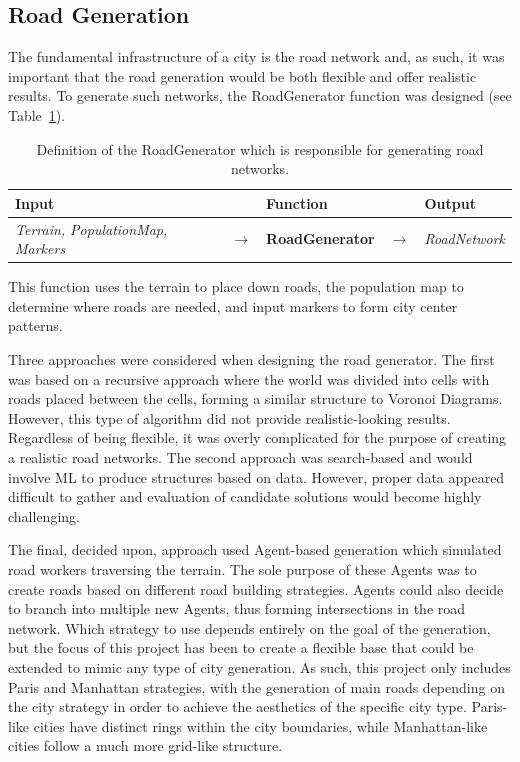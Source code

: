 \subsection{Road Generation}
The fundamental infrastructure of a city is the road network and, as such, it was important that the road generation would be both flexible and offer realistic results.
To generate such networks, the RoadGenerator function was designed (see Table~\ref{table:def_roadgen}).

\begin{table}[H]
  \centering
  \begin{tabular}{lllll}
    \textbf{Input} & & \textbf{Function} & & \textbf{Output} \\
    \midrule
    \textit{Terrain, PopulationMap, Markers} & $\rightarrow$ & \textbf{RoadGenerator}       & $\rightarrow$ & \textit{RoadNetwork}    \\
    \bottomrule
  \end{tabular}

  \caption{Definition of the RoadGenerator which is responsible for generating road networks.}
  \label{table:def_roadgen}
\end{table}
\vspace{-0.4cm}

This function uses the terrain to place down roads, the population map to determine where roads are needed, and input markers to form city center patterns.

Three approaches were considered when designing the road generator.
The first was based on a recursive approach where the world was divided into cells with roads placed between the cells, forming a similar structure to Voronoi Diagrams.
However, this type of algorithm did not provide realistic-looking results.
Regardless of being flexible, it was overly complicated for the purpose of creating a realistic road networks.
The second approach was search-based and would involve ML to produce structures based on data.
However, proper data appeared difficult to gather and evaluation of candidate solutions would become highly challenging.

The final, decided upon, approach used Agent-based generation which simulated road workers traversing the terrain.
The sole purpose of these Agents was to create roads based on different road building strategies.
Agents could also decide to branch into multiple new Agents, thus forming intersections in the road network.
Which strategy to use depends entirely on the goal of the generation, but the focus of this project has been to create a flexible base that could be extended to mimic any type of city generation.
As such, this project only includes Paris and Manhattan strategies, with the generation of main roads depending on the city strategy in order to achieve the aesthetics of the specific city type.
Paris-like cities have distinct rings within the city boundaries, while Manhattan-like cities follow a much more grid-like structure.

